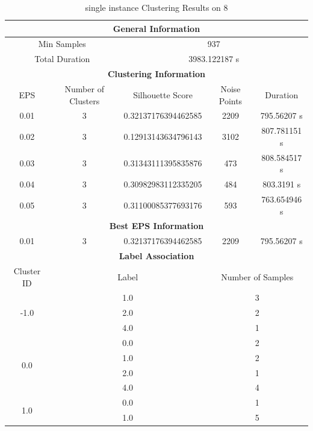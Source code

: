 \begin{longtable}{|c|c|c|c|c|}
\caption{single instance Clustering Results on 8} \label{tab:8_single_instance_clustering_results}\\
\hline
\multicolumn{5}{|c|}{\textbf{General Information}} \\
\hline
\multicolumn{2}{|c|}{Min Samples} & \multicolumn{3}{c|}{937} \\
\multicolumn{2}{|c|}{Total Duration} & \multicolumn{3}{c|}{3983.122187 s} \\
\hline
\multicolumn{5}{|c|}{\textbf{Clustering Information}} \\
\hline
EPS & Number of Clusters & Silhouette Score & Noise Points & Duration \\
0.01 & 3 & 0.32137176394462585 & 2209 & 795.56207 s\\
0.02 & 3 & 0.12913143634796143 & 3102 & 807.781151 s\\
0.03 & 3 & 0.31343111395835876 & 473 & 808.584517 s\\
0.04 & 3 & 0.30982983112335205 & 484 & 803.3191 s\\
0.05 & 3 & 0.31100085377693176 & 593 & 763.654946 s\\
\hline
\multicolumn{5}{|c|}{\textbf{Best EPS Information}} \\
\hline
0.01 & 3 & 0.32137176394462585 & 2209 & 795.56207 s\\
\hline
\multicolumn{5}{|c|}{\textbf{Label Association}} \\
\hline
Cluster ID & \multicolumn{2}{c|}{Label} & \multicolumn{2}{c|}{Number of Samples} \\
\hline
\multirow{3}{*}{-1.0} & \multicolumn{2}{c|}{1.0} & \multicolumn{2}{c|}{3} \\
& \multicolumn{2}{c|}{2.0} & \multicolumn{2}{c|}{2} \\
& \multicolumn{2}{c|}{4.0} & \multicolumn{2}{c|}{1} \\
\hline
\multirow{4}{*}{0.0} & \multicolumn{2}{c|}{0.0} & \multicolumn{2}{c|}{2} \\
& \multicolumn{2}{c|}{1.0} & \multicolumn{2}{c|}{2} \\
& \multicolumn{2}{c|}{2.0} & \multicolumn{2}{c|}{1} \\
& \multicolumn{2}{c|}{4.0} & \multicolumn{2}{c|}{4} \\
\hline
\multirow{4}{*}{1.0} & \multicolumn{2}{c|}{0.0} & \multicolumn{2}{c|}{1} \\
& \multicolumn{2}{c|}{1.0} & \multicolumn{2}{c|}{5} \\

\end{longtable}
